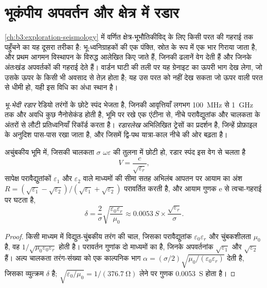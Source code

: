 \section{भूकंपीय अपवर्तन और क्षेत्र में रडार}\label{sec:b3:field-lab-methods-3:radar}

\cref{ch:b3:exploration-seismology} में वर्णित 
क्षेत्र-भूभौतिकीविद् के लिए किसी परत की गहराई तक पहुँचने का यह दूसरा तरीका है: भू-ध्वनिग्राहकों की एक पंक्ति,
स्रोत के रूप में एक भार गिराया जाता है, और प्रथम आगमन
विस्थापन के विरुद्ध आलेखित किए जाते हैं, जिनकी ढलानें वेग देती हैं और
जिनके अंतःखंड अपवर्तकों की गहराई देते हैं। वार्डन घाटी की तली पर यह
ग्रेनाइट का ऊपरी भाग देख लेगा, जो उसके ऊपर के किसी भी अवसाद से तेज़ होता है; यह
उस परत को नहीं देख सकता जो ऊपर वाली परत से धीमी हो, यही
इस विधि का अंधा स्थान है।

\begin{definition}[भू-भेदी रडार; रडारलेख]\label{def:b3:field-lab-methods-3:gpr}
\emph{भू-भेदी रडार} रेडियो तरंगों के छोटे स्पंद भेजता है,
जिनकी आवृत्तियाँ लगभग \qty{100}{MHz} से
\qty{1}{GHz} तक और अवधि कुछ नैनोसेकंड होती है, भूमि पर रखे एक एंटीना से,
नीचे परावैद्युतांक और चालकता के अंतरों से लौटी प्रतिध्वनियाँ रिकॉर्ड करता है। 
\emph{रडारलेख} अभिलिखित ट्रेसों का प्रदर्शन है, जिन्हें प्रोफ़ाइल के
अनुदिश पास-पास रखा जाता है, और जिसमें द्वि-पथ
यात्रा-काल नीचे की ओर बढ़ता है।
\end{definition}

\begin{proposition}[रडार वेग, परावर्तन और भेदन]\label{prop:b3:field-lab-methods-3:radar}
अचुंबकीय भूमि में, जिसकी चालकता $\sigma$
$\omega\varepsilon$ की तुलना में छोटी हो, रडार स्पंद इस वेग से चलता है
\[
V = \frac{c}{\sqrt{\varepsilon_r}} ,
\]
सापेक्ष परावैद्युतांकों $\varepsilon_1$ और
$\varepsilon_2$ वाले माध्यमों की सीमा सतह अभिलंब आपतन पर आयाम का अंश $R =
(\sqrt{\varepsilon_1} - \sqrt{\varepsilon_2})/(\sqrt{\varepsilon_1} +
\sqrt{\varepsilon_2})$ परावर्तित करती है, और आयाम
गुणक $\mathrm{e}$ से त्वचा-गहराई पर घटता है,
\[
\delta = \frac{2}{\sigma}\sqrt{\frac{\varepsilon_0\varepsilon_r}{\mu_0}}
       \approx \qty{0.0053}{S}\times\frac{\sqrt{\varepsilon_r}}{\sigma} .
\]
\end{proposition}

\begin{proof}
किसी माध्यम में विद्युत-चुंबकीय तरंग की चाल, जिसका परावैद्युतांक
$\varepsilon_0\varepsilon_r$ और चुंबकशीलता $\mu_0$ है, वह
$1/\sqrt{\mu_0\varepsilon_0\varepsilon_r}$ होती है। परावर्तन गुणांक
दो माध्यमों का है, जिनके अपवर्तनांक $\sqrt{\varepsilon_1}$ और
$\sqrt{\varepsilon_2}$ हैं। अल्प चालकता तरंग-संख्या को एक काल्पनिक भाग
$\alpha = (\sigma/2)\sqrt{\mu_0/(\varepsilon_0
\varepsilon_r)}$ देती है, जिसका व्युत्क्रम $\delta$ है; $\sqrt{\varepsilon_0/
\mu_0} = 1/(\qty{376.7}{\ohm})$ लेने पर गुणक \qty{0.0053}{S} होता है।
\end{proof}

